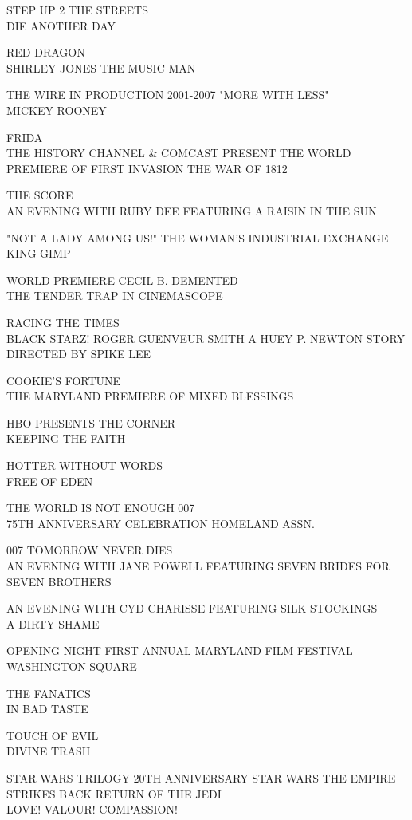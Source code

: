 \documentclass[10pt,letterpaper]{article}
\begin{document}
STEP UP 2 THE STREETS\\
DIE ANOTHER DAY

RED DRAGON\\
SHIRLEY JONES THE MUSIC MAN

THE WIRE IN PRODUCTION 2001{-}2007 "MORE WITH LESS"\\
MICKEY ROONEY

FRIDA\\
THE HISTORY CHANNEL \& COMCAST PRESENT THE WORLD PREMIERE OF FIRST INVASION THE WAR OF 1812

THE SCORE\\
AN EVENING WITH RUBY DEE FEATURING A RAISIN IN THE SUN

"NOT A LADY AMONG US!" THE WOMAN'S INDUSTRIAL EXCHANGE\\
KING GIMP

WORLD PREMIERE CECIL B. DEMENTED\\
THE TENDER TRAP IN CINEMASCOPE

RACING THE TIMES\\
BLACK STARZ!  ROGER GUENVEUR SMITH A HUEY P. NEWTON STORY DIRECTED BY SPIKE LEE

COOKIE'S FORTUNE\\
THE MARYLAND PREMIERE OF MIXED BLESSINGS

HBO PRESENTS THE CORNER\\
KEEPING THE FAITH

HOTTER WITHOUT WORDS\\
FREE OF EDEN

THE WORLD IS NOT ENOUGH 007\\
75TH ANNIVERSARY CELEBRATION HOMELAND ASSN.

007 TOMORROW NEVER DIES\\
AN EVENING WITH JANE POWELL FEATURING SEVEN BRIDES FOR SEVEN BROTHERS

AN EVENING WITH CYD CHARISSE FEATURING SILK STOCKINGS\\
A DIRTY SHAME

OPENING NIGHT FIRST ANNUAL MARYLAND FILM FESTIVAL\\
WASHINGTON SQUARE

THE FANATICS\\
IN BAD TASTE

TOUCH OF EVIL\\
DIVINE TRASH

STAR WARS TRILOGY 20TH ANNIVERSARY STAR WARS THE EMPIRE STRIKES BACK RETURN OF THE JEDI\\
LOVE!  VALOUR!  COMPASSION!
\end{document}

